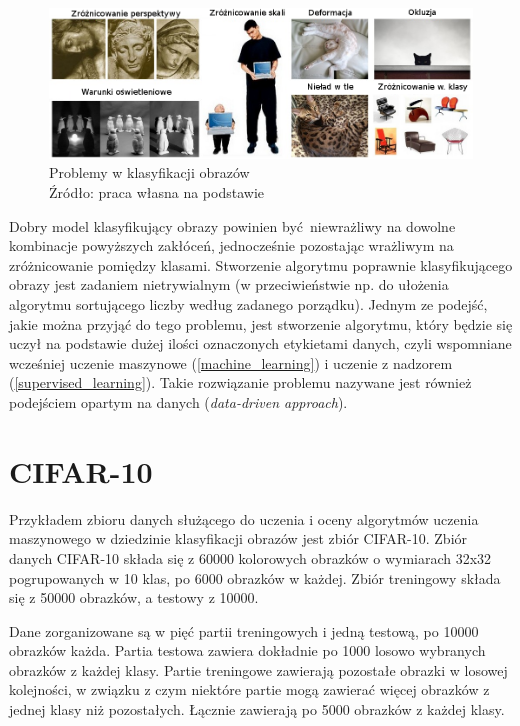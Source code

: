 \begin{figure}[h!tb]
	 \centering
	 \includegraphics[width = 1.0\linewidth]{img/klas_problemy}
	 \caption{Problemy w klasyfikacji obrazów \\
              Źródło: praca własna na podstawie \cite{cs231n}}
	 \label{fig:classification_problems}
\end{figure}

Dobry model klasyfikujący obrazy powinien być niewrażliwy na dowolne kombinacje powyższych zakłóceń, jednocześnie pozostając wrażliwym na zróżnicowanie pomiędzy klasami.
Stworzenie algorytmu poprawnie klasyfikującego obrazy jest zadaniem nietrywialnym (w przeciwieństwie np. do ułożenia algorytmu sortującego liczby według zadanego porządku).
Jednym ze podejść, jakie można przyjąć do tego problemu, jest stworzenie algorytmu, który będzie się uczył na podstawie dużej ilości oznaczonych etykietami danych, czyli wspomniane wcześniej uczenie maszynowe (\ref{machine_learning}) i uczenie z nadzorem (\ref{supervised_learning}).
Takie rozwiązanie problemu nazywane jest również podejściem opartym na danych (\textit{data-driven approach}).
\cite{cs231n}


\section{CIFAR-10}
Przykładem zbioru danych służącego do uczenia i oceny algorytmów uczenia maszynowego w dziedzinie klasyfikacji obrazów jest zbiór CIFAR-10.
Zbiór danych CIFAR-10 składa się z 60000 kolorowych obrazków o wymiarach 32x32 pogrupowanych w 10 klas, po 6000 obrazków w każdej. Zbiór treningowy składa się z 50000 obrazków, a testowy z 10000.

Dane zorganizowane są w pięć partii treningowych i jedną testową, po 10000 obrazków każda. Partia testowa zawiera dokładnie po 1000 losowo wybranych obrazków z każdej klasy. Partie treningowe zawierają pozostałe obrazki w losowej kolejności, w związku z czym niektóre partie mogą zawierać więcej obrazków z jednej klasy niż pozostałych. Łącznie zawierają po 5000 obrazków z każdej klasy.

